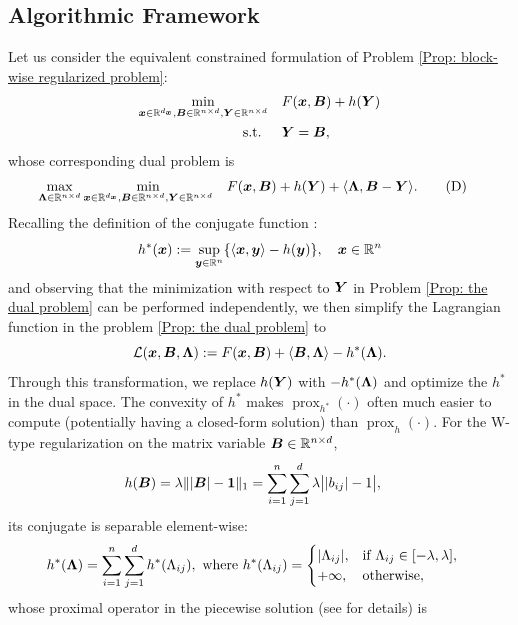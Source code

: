 \subsection{Algorithmic Framework}
Let us consider the equivalent constrained formulation of Problem \eqref{Prop: block-wise regularized problem}:
\begin{align} 
\min_{\bm{x} \in \mathbb{R}^{d_{\bm{x}}}, \bm{B} \in \mathbb{R}^{n\times d}, \bm{Y} \in \mathbb{R}^{n\times d}} &\quad F(\bm{x}, \bm{B}) + h(\bm{Y}) \notag \\
\text{s.t. } &\quad \bm{Y} = \bm{B} \nonumber ,
\end{align} whose corresponding dual problem is 
\begin{align}
\label{Prop: the dual problem}
\max_{\bm{\Lambda} \in \mathbb{R}^{n\times d}} \min_{\bm{x} \in \mathbb{R}^{d_{\bm{x}}}, \bm{B} \in \mathbb{R}^{n\times d}, \bm{Y} \in \mathbb{R}^{n\times d}} &\quad F(\bm{x}, \bm{B}) + h(\bm{Y}) + \langle \bm{\Lambda}, \bm{B} - \bm{Y} \rangle. \tag{D}
\end{align} 
Recalling the definition of the conjugate function \cite{Rockafellar1998VariationalA}:
\begin{equation}
h^*(\bm{x}) := \sup_{\bm{y} \in \mathbb{R}^{n}} \{ \langle \bm{x}, \bm{y} \rangle - h(\bm{y}) \}, \quad \bm{x} \in \mathbb{R}^{n}
\end{equation} and observing that the minimization with respect to $\bm{Y}$ in Problem \eqref{Prop: the dual problem} can be performed independently, we then simplify the Lagrangian function in the problem \eqref{Prop: the dual problem} to 
\begin{equation}
\label{Eq: simplified_lagrangian}
\mathcal{L}(\bm{x}, \bm{B}, \bm{\Lambda}) := F(\bm{x}, \bm{B}) + \langle \bm{B}, \bm{\Lambda} \rangle - h^*(\bm{\Lambda}).
\end{equation}
Through this transformation, we replace $h(\bm{Y})$ with $-h^*(\bm{\Lambda})$ and optimize the \(h^*\) in the dual space. The convexity of $h^*$ makes $\operatorname{prox}_{h^*}(\cdot)$ often much easier to compute (potentially having a closed-form solution) than $\operatorname{prox}_{h}(\cdot)$.
For the W-type regularization on the matrix variable $\bm{B} \in \mathbb{R}^{n \times d}$,
\begin{align*}
&h(\bm{B})= \lambda\||\bm{B}|-\bm{1}\|_1 = \sum_{i=1}^{n}\sum_{j=1}^{d}\lambda\big||b_{ij}|-1\big|,
\end{align*}
its conjugate is separable element-wise:
\begin{align*}
&h^*(\bm{\Lambda}) = \sum_{i=1}^{n}\sum_{j=1}^{d} h^*(\Lambda_{ij}),\,\, \text{where } h^*(\Lambda_{ij}) = \begin{cases}
    |\Lambda_{ij}|, & \text{if } \Lambda_{ij} \in [-\lambda, \lambda],\\
    +\infty, & \text{otherwise},
    \end{cases}
\end{align*} whose proximal operator in the piecewise solution (see  for details) is 
